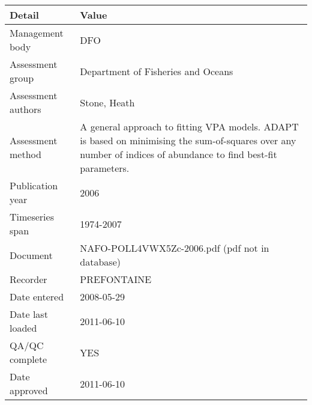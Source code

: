 \begin{table}[htb]
\centering
\begin{tabular}{lp{7cm}}
\toprule
Detail & Value \\
\midrule
Management body    & DFO                                                                                                                                                            \\
Assessment group   & Department of Fisheries and Oceans                                                                                                                             \\
Assessment authors & Stone, Heath                                                                                                                                                   \\
Assessment method  & A general approach to fitting VPA models. ADAPT is based on minimising the sum-of-squares over any number of indices of abundance to find best-fit parameters. \\
Publication year   & 2006                                                                                                                                                           \\
Timeseries span    & 1974-2007                                                                                                                                                      \\
Document           & NAFO-POLL4VWX5Zc-2006.pdf (pdf not in database)                                                                                                                \\
Recorder           & PREFONTAINE                                                                                                                                                    \\
Date entered       & 2008-05-29                                                                                                                                                     \\
Date last loaded   & 2011-06-10                                                                                                                                                     \\
QA/QC complete     & YES                                                                                                                                                            \\
Date approved      & 2011-06-10                                                                                                                                                     \\
\bottomrule
\end{tabular}
\label{tab:assessdet}
\end{table}

